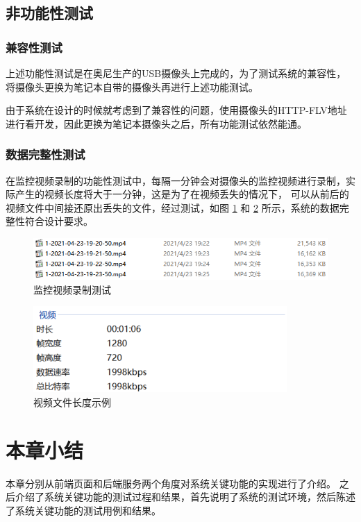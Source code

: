 \newpage
\subsection{非功能性测试}
\subsubsection{兼容性测试}
上述功能性测试是在奥尼生产的USB摄像头上完成的，为了测试系统的兼容性，
将摄像头更换为笔记本自带的摄像头再进行上述功能测试。

由于系统在设计的时候就考虑到了兼容性的问题，使用摄像头的HTTP-FLV地址进行看开发，因此更换为笔记本摄像头之后，所有功能测试依然能通。

\subsubsection{数据完整性测试}
在监控视频录制的功能性测试中，每隔一分钟会对摄像头的监控视频进行录制，实际产生的视频长度将大于一分钟，这是为了在视频丢失的情况下，
可以从前后的视频文件中间接还原出丢失的文件，经过测试，如图 \ref{Fig:file_red} 和 \ref{Fig:det} 所示，系统的数据完整性符合设计要求。

\begin{figure}[ht]
    \centering
    \includegraphics[width=1\linewidth]{./Figure/IMG_file_red.png}
    \caption{监控视频录制测试}\label{Fig:file_red}
\end{figure}

\begin{figure}[ht]
    \centering
    \includegraphics[width=.8\linewidth]{./Figure/IMG_det.png}
    \caption{视频文件长度示例}\label{Fig:det}
\end{figure}

\newpage
\section{本章小结}
本章分别从前端页面和后端服务两个角度对系统关键功能的实现进行了介绍。
之后介绍了系统关键功能的测试过程和结果，首先说明了系统的测试环境，然后陈述了系统关键功能的测试用例和结果。


